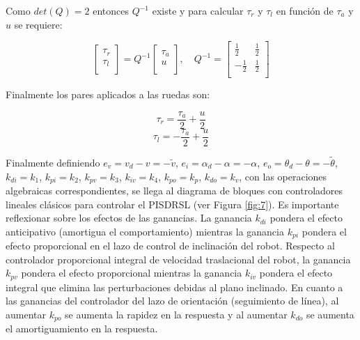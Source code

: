\documentclass{article}
\begin{document}
Como $det(Q)=2$ entonces $Q^{-1}$ existe y para calcular $\tau_r$ y $\tau_l$ en función de $\tau_a$ y $u$ se requiere:

\begin{equation}
    \begin{bmatrix}
        \tau_r \\
        \tau_l \\
    \end{bmatrix} 
    = Q^{-1} \begin{bmatrix}
        \tau_a\\
        u\\
    \end{bmatrix}, \quad 
    Q^{-1}=\begin{bmatrix}
        \frac{1}{2} & \frac{1}{2} \\
        -\frac{1}{2} & \frac{1}{2} \\
    \end{bmatrix}
    \label{eq:46}
\end{equation}

Finalmente los pares aplicados a las ruedas son:

\begin{equation}
    \tau_r=\dfrac{\tau_a}{2}+\dfrac{u}{2}
    \label{eq:47}
\end{equation}
\begin{equation}
    \tau_l=-\dfrac{\tau_a}{2}+\dfrac{u}{2}
    \label{eq:48}
\end{equation}

Finalmente definiendo $e_v = v_d - v = -\tilde{v}$, $e_i = \alpha_d - \alpha = -\alpha$, $e_o = \theta_d - \theta = -\tilde{\theta}$, $k_{di} = k_1$, $k_{pi} = k_2$, 
$k_{pv} = k_3$, $k_{iv} = k_4$, $k_{po} = k_p$, $k_{do} = k_v$, con las operaciones algebraicas correspondientes, se llega al diagrama 
de bloques con controladores lineales clásicos para controlar el PISDRSL (ver Figura \ref{fig:7}). Es importante reflexionar sobre los efectos de las 
ganancias. La ganancia $k_{di}$ pondera el efecto anticipativo (amortigua el comportamiento) mientras la ganancia $k_{pi}$ pondera el efecto 
proporcional en el lazo de control de inclinación del robot. Respecto al controlador proporcional integral de velocidad traslacional del 
robot, la ganancia $k_{pv}$ pondera el efecto proporcional mientras la ganancia $k_{iv}$ pondera el efecto integral que elimina las perturbaciones 
debidas al plano inclinado. En cuanto a las ganancias del controlador del lazo de orientación (seguimiento de línea), al aumentar $k_{po}$ se 
aumenta la rapidez en la respuesta y al aumentar $k_{do}$ se aumenta el amortiguamiento en la respuesta.
\end{document}
